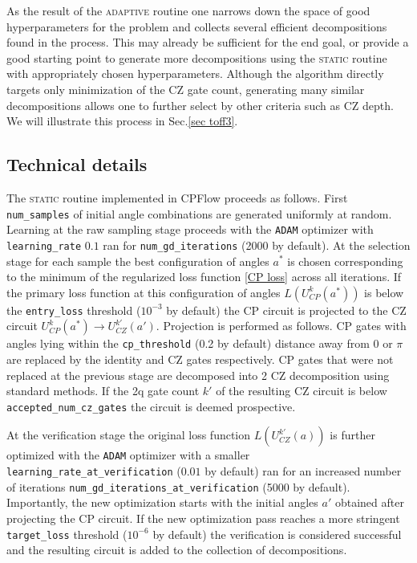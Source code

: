 \documentclass[draft, twocolumn, amsfonts, amssymb, aps, nofootinbib]{revtex4-2}
\newcommand{\CZ}{\textsf{CZ }}
\newcommand{\CP}{\textsf{CP }}
\newcommand{\package}[1]{\textrm {#1 }}
\newcommand{\cpflow}{\package{CPFlow}}
\newcommand{\static}{\textsc{static }}
\newcommand{\adaptive}{\textsc{adaptive }}
\newcommand{\param}[1]{\texttt{#1}}
\begin{document}
As the result of the \adaptive routine one narrows down the space of good hyperparameters for the problem and collects several efficient decompositions found in the process. This may already be sufficient for the end goal, or provide a good starting point to generate more decompositions using the \static routine with appropriately chosen hyperparameters. Although the algorithm directly targets only minimization of the \CZ gate count, generating many similar decompositions allows one to further select by other criteria such as \CZ depth. We will illustrate this process in Sec.\ref{sec toff3}.

\subsection{Technical details \label{sec details}}

The \static routine implemented in \cpflow proceeds as follows.
First \param{num\_samples} of initial angle combinations are generated uniformly at random. Learning at the raw sampling stage proceeds with the \param{ADAM} optimizer with \param{learning\_rate} $0.1$ ran for \param{num\_gd\_iterations} (2000 by default).
At the selection stage for each sample the best configuration of angles $a^*$ is chosen corresponding to the minimum of the regularized loss function \eqref{CP loss} across all iterations. If the primary loss function at this configuration of angles $L(U_{CP}^k(a^*))$ is below the \param{entry\_loss} threshold ($10^{-3}$ by default) the \CP circuit is projected to the \CZ circuit $U_{CP}^k(a^*)\to U_{CZ}^{k'}(a')$. Projection is performed as follows. \CP gates with angles lying within the \param{cp\_threshold}  (0.2 by default) distance away from $0$ or $\pi$ are replaced by the identity and \CZ gates respectively.  \CP gates that were not replaced at the previous stage are decomposed into 2 \CZ decomposition using standard methods. If the 2q gate count $k'$ of the resulting \CZ circuit is below \param{accepted\_num\_cz\_gates} the circuit is deemed prospective.

At the verification stage the original loss function $L(U_{CZ}^{k'}(a))$ is further optimized with the \param{ADAM} optimizer with a smaller \param{learning\_rate\_at\_verification} ($0.01$ by default) ran for an increased number of iterations \param{num\_gd\_iterations\_at\_verification} (5000 by default). Importantly, the new optimization starts with the initial angles $a'$ obtained after projecting the \CP circuit. If the new optimization pass reaches a more stringent \param{target\_loss} threshold ($10^{-6}$ by default) the verification is considered successful and the resulting circuit is added to the collection of decompositions.
\end{document}
